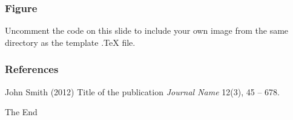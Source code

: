 \documentclass{beamer}
\begin{document}
\begin{frame}
\end{frame}


\begin{frame}
\frametitle{Figure}
Uncomment the code on this slide to include your own image from the same directory as the template .TeX file.
\end{frame}


\begin{frame}
\end{frame}


\begin{frame}
\frametitle{References}
\footnotesize{
\begin{thebibliography}{99} %
 John Smith (2012)
\newblock Title of the publication
\newblock \emph{Journal Name} 12(3), 45 -- 678.
\end{thebibliography}
}
\end{frame}


\begin{frame}
\Huge{\centerline{The End}}
\end{frame}

\end{document}
